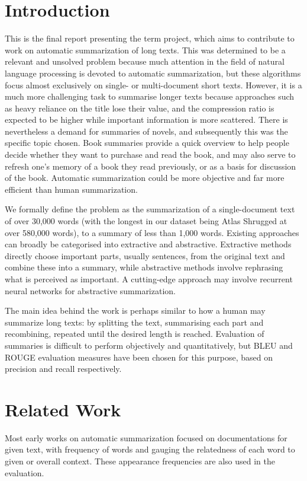 \section{Introduction}
This is the final report presenting the term project, which aims to contribute to work on automatic summarization of long texts. This was determined to be a relevant and unsolved problem because much attention in the field of natural language processing is devoted to automatic summarization, but these algorithms focus almost exclusively on single- or multi-document short texts. However, it is a much more challenging task to summarise longer texts because approaches such as heavy reliance on the title lose their value, and the compression ratio is expected to be higher while important information is more scattered. There is nevertheless a demand for summaries of novels, and subsequently this was the specific topic chosen. Book summaries provide a quick overview to help people decide whether they want to purchase and read the book, and may also serve to refresh one's memory of a book they read previously, or as a basis for discussion of the book. Automatic summarization could be more objective and far more efficient than human summarization.

We formally define the problem as the summarization of a single-document text of over 30,000 words (with the longest in our dataset being Atlas Shrugged at over 580,000 words), to a summary of less than 1,000 words. Existing approaches can broadly be categorised into extractive and abstractive. Extractive methods directly choose important parts, usually sentences, from the original text and combine these into a summary, while abstractive methods involve rephrasing what is perceived as important. A cutting-edge approach may involve recurrent neural networks for abstractive summarization.


The main idea behind the work is perhaps similar to how a human may summarize long texts: by splitting the text, summarising each part and recombining, repeated until the desired length is reached. Evaluation of summaries is difficult to perform objectively and quantitatively, but BLEU and ROUGE evaluation measures have been chosen for this purpose, based on precision and recall respectively.

\section{Related Work}
Most early works on 
automatic summarization focused on documentations for given text, with 
frequency of words and gauging the relatedness of each word to given or overall
context. These appearance frequencies are also used in the evaluation.

